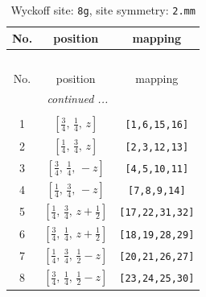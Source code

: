 \documentclass[fleqn,8pt]{jsarticle}
\begin{document}
\begin{longtable}{ccc}
\caption{Wyckoff site: {\tt 8g}, site symmetry: {\tt 2.mm}}
 \\
 \hline \hline
No. & position & mapping \\ \hline \endfirsthead

\multicolumn{2}{l}{\tablename\ \thetable{}} \\
 \hline \hline
No. & position & mapping \\ \hline \endhead

 \hline \hline
\multicolumn{2}{r}{\footnotesize\it continued ...} \\ \endfoot

 \hline \hline
\multicolumn{2}{r}{} \\ \endlastfoot

1 & $\left[ \frac{3}{4},\, \frac{1}{4},\, z \right]$ & {\tt [1,6,15,16]} \\ \hline
2 & $\left[ \frac{1}{4},\, \frac{3}{4},\, z \right]$ & {\tt [2,3,12,13]} \\ \hline
3 & $\left[ \frac{3}{4},\, \frac{1}{4},\, - z \right]$ & {\tt [4,5,10,11]} \\ \hline
4 & $\left[ \frac{1}{4},\, \frac{3}{4},\, - z \right]$ & {\tt [7,8,9,14]} \\ \hline
5 & $\left[ \frac{1}{4},\, \frac{3}{4},\, z + \frac{1}{2} \right]$ & {\tt [17,22,31,32]} \\ \hline
6 & $\left[ \frac{3}{4},\, \frac{1}{4},\, z + \frac{1}{2} \right]$ & {\tt [18,19,28,29]} \\ \hline
7 & $\left[ \frac{1}{4},\, \frac{3}{4},\, \frac{1}{2} - z \right]$ & {\tt [20,21,26,27]} \\ \hline
8 & $\left[ \frac{3}{4},\, \frac{1}{4},\, \frac{1}{2} - z \right]$ & {\tt [23,24,25,30]} \\
\end{longtable}
\renewcommand{\arraystretch}{1.2}
\end{document}
